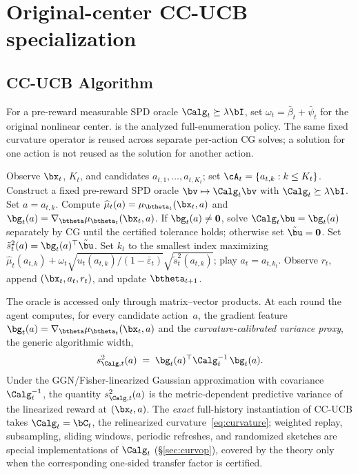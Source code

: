 \section{Original-center CC-UCB specialization}\label{sec:method}

\subsection{CC-UCB Algorithm}

For a pre-reward measurable SPD oracle $\Calg_t\succeq\lambda\bI$, set
$\omega_t=\bar\beta_t+\bar\psi_t$ for the original nonlinear center.
 is the analyzed full-enumeration policy.  The same fixed
curvature operator is reused across separate per-action CG solves; a solution
for one action is not reused as the solution for another action.
\begin{algorithm}[H]
\caption{Curvature-Calibrated UCB (CC-UCB)}\label{alg:ccucb}
\begin{algorithmic}[1]
\STATE Observe $\bx_t$, $K_t$, and candidates
$a_{t,1},\ldots,a_{t,K_t}$; set $\cA_t=\{a_{t,k}:k\le K_t\}$.
\STATE Construct a fixed pre-reward SPD oracle $\bv\mapsto\Calg_t\bv$ with $\Calg_t\succeq\lambda\bI$.
  \STATE Set $a=a_{t,k}$.
  \STATE Compute $\widehat\mu_t(a)=\mu_{\btheta_t}(\bx_t,a)$ and $\bg_t(a)=\nabla_{\btheta}\mu_{\btheta_t}(\bx_t,a)$.
  \STATE If $\bg_t(a)\ne\mathbf0$, solve $\Calg_t\bu=\bg_t(a)$ separately by CG until the certified tolerance holds; otherwise set $\tilde\bu=\mathbf0$. \label{line:cg}
  \STATE Set $\tilde s_t^2(a)=\bg_t(a)^\top\tilde\bu$.
\ENDFOR
\STATE Set $k_t$ to the smallest index maximizing
$\widehat\mu_t(a_{t,k})+\omega_t\sqrt{u_t(a_{t,k})/(1-\bar\varepsilon_t)}
\sqrt{\tilde s_t^2(a_{t,k})}$; play $a_t=a_{t,k_t}$. \label{line:ucb}
\STATE Observe $r_t$, append $(\bx_t,a_t,r_t)$, and update $\btheta_{t+1}$.
\end{algorithmic}
\end{algorithm}

The oracle is accessed only through matrix--vector products.  At each round the
agent computes,
for every candidate action~$a$, the gradient feature
$\bg_t(a)=\nabla_{\btheta}\mu_{\btheta_t}(\bx_t,a)$ and the
\emph{curvature-calibrated variance proxy}, the generic algorithmic width,
\begin{equation}\label{eq:variance}
  s_{\Calg,t}^2(a)
  \;=\;
  \bg_t(a)^\top\Calg_t^{-1}\,\bg_t(a).
\end{equation}
Under the GGN/Fisher-linearized Gaussian approximation with covariance
$\Calg_t^{-1}$, the quantity $s_{\Calg,t}^2(a)$ is the metric-dependent
predictive variance of the linearized reward at $(\bx_t,a)$.
The \emph{exact} full-history instantiation of CC-UCB takes $\Calg_t=\bC_t$, the
relinearized curvature~\eqref{eq:curvature}; weighted replay, subsampling,
sliding windows, periodic refreshes, and randomized sketches are special
implementations of $\Calg_t$ (\S\ref{sec:curvop}), covered by the theory only
when the corresponding one-sided transfer factor is certified.

